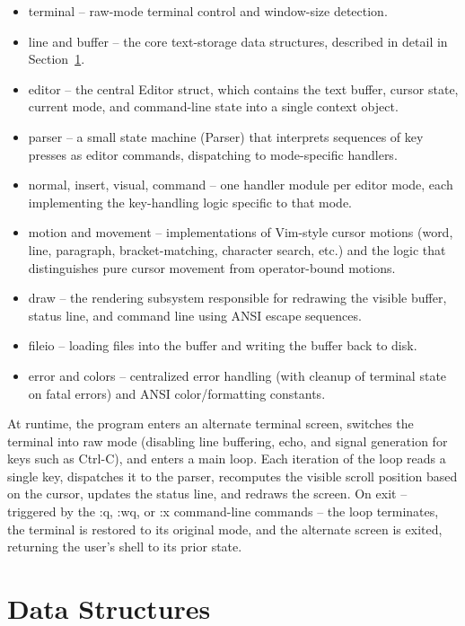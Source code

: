 \documentclass[journal]{IEEEtran}
\begin{document}
\begin{itemize}
    \item terminal -- raw-mode terminal control and window-size detection.
    \item line and buffer -- the core text-storage data structures, described in detail in Section~\ref{sec:data-structures}.
    \item editor -- the central Editor struct, which contains the text buffer, cursor state, current mode, and command-line state into a single context object.
    \item parser -- a small state machine (Parser) that interprets sequences of key presses as editor commands, dispatching to mode-specific handlers.
    \item normal, insert, visual, command -- one handler module per editor mode, each implementing the key-handling logic specific to that mode.
    \item motion and movement -- implementations of Vim-style cursor motions (word, line, paragraph, bracket-matching, character search, etc.) and the logic that distinguishes pure cursor movement from operator-bound motions.
    \item draw -- the rendering subsystem responsible for redrawing the visible buffer, status line, and command line using ANSI escape sequences.
    \item fileio -- loading files into the buffer and writing the buffer back to disk.
    \item error and colors -- centralized error handling (with cleanup of terminal state on fatal errors) and ANSI color/formatting constants.
\end{itemize}

At runtime, the program enters an alternate terminal screen, switches the terminal into raw mode (disabling line buffering, echo, and signal generation for keys such as Ctrl-C), and enters a main loop. Each iteration of the loop reads a single key, dispatches it to the parser, recomputes the visible scroll position based on the cursor, updates the status line, and redraws the screen. On exit -- triggered by the :q, :wq, or :x command-line commands -- the loop terminates, the terminal is restored to its original mode, and the alternate screen is exited, returning the user's shell to its prior state.

\section{Data Structures}
\label{sec:data-structures}
\end{document}
